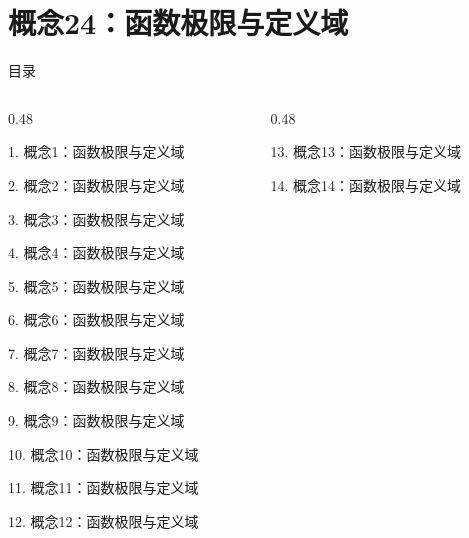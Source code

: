 \documentclass[aspectratio=169,10pt,fontset=fandol]{ctexbeamer}
\begin{document}
\section{概念24：函数极限与定义域}
\begin{frame}[t,fragile]{目录}
\small
\begin{columns}[T,onlytextwidth]
\begin{column}{0.48\textwidth}
{\color{black}\small 1. 概念1：函数极限与定义域\par}\vspace{0.22em}
{\color{black}\small 2. 概念2：函数极限与定义域\par}\vspace{0.22em}
{\color{black}\small 3. 概念3：函数极限与定义域\par}\vspace{0.22em}
{\color{black}\small 4. 概念4：函数极限与定义域\par}\vspace{0.22em}
{\color{black}\small 5. 概念5：函数极限与定义域\par}\vspace{0.22em}
{\color{black}\small 6. 概念6：函数极限与定义域\par}\vspace{0.22em}
{\color{black}\small 7. 概念7：函数极限与定义域\par}\vspace{0.22em}
{\color{black}\small 8. 概念8：函数极限与定义域\par}\vspace{0.22em}
{\color{black}\small 9. 概念9：函数极限与定义域\par}\vspace{0.22em}
{\color{black}\small 10. 概念10：函数极限与定义域\par}\vspace{0.22em}
{\color{black}\small 11. 概念11：函数极限与定义域\par}\vspace{0.22em}
{\color{black}\small 12. 概念12：函数极限与定义域\par}\vspace{0.22em}
\end{column}
\begin{column}{0.48\textwidth}
{\color{black}\small 13. 概念13：函数极限与定义域\par}\vspace{0.22em}
{\color{black}\small 14. 概念14：函数极限与定义域\par}\vspace{0.22em}

\end{column}
\end{columns}
\end{frame}
\end{document}
